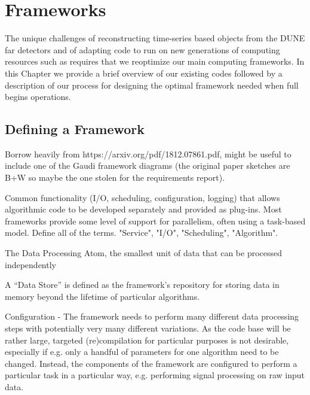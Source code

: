 \documentclass[../main-v1.tex]{subfiles}
\begin{document}
\chapter{Frameworks }
\label{ch:fworks}

The unique challenges of reconstructing time-series based objects from the DUNE far detectors and of adapting code to run on new generations of computing resources such as  requires that we reoptimize our main computing frameworks.  In this Chapter we provide a brief overview of our existing codes followed by a description of our process for designing the optimal framework needed when full  begins operations.  

\section{Defining a Framework}

Borrow heavily from https://arxiv.org/pdf/1812.07861.pdf, might be useful to include one of the Gaudi framework diagrams (the original paper sketches are B+W so maybe the one stolen for the requirements report).

Common functionality (I/O, scheduling, configuration, logging) that allows algorithmic code to be developed separately and provided as plug-ins.  Most frameworks provide some level of support for parallelism, often using a task-based model. Define all of the terms.
"Service", "I/O", "Scheduling", "Algorithm".

The Data Processing Atom, the smallest unit of data that can be processed independently

A “Data Store” is defined as the framework’s repository for storing data in memory beyond the lifetime of particular algorithms.

Configuration - The framework needs to perform many different data processing steps with potentially very many different variations.  As the code base will be rather large, targeted (re)compilation for particular purposes is not desirable, especially if e.g. only a handful of parameters for one algorithm need to be changed.  Instead, the components of the framework are configured to perform a particular task in a particular way, e.g. performing signal processing on raw input data.  
\end{document}
